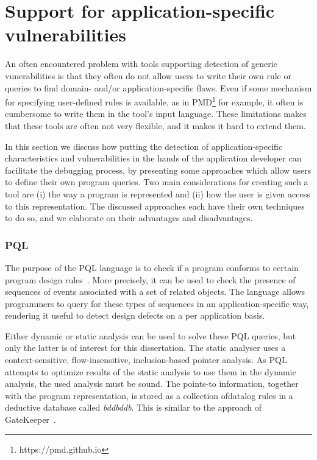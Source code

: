 \section{Support for application-specific vulnerabilities}
\label{sec:applicationSpecificVulnerabilities}

An often encountered problem with tools supporting detection of generic vunerabilities is that they often do not allow users to write their own rule or queries to find domain- and/or application-specific flaws. Even if some mechanism for specifying user-defined rules is available, as in PMD\footnote{https://pmd.github.io} for example, it often is cumbersome to write them in the tool's input language. These limitations makes that these tools are often not very flexible, and it makes it hard to extend them. 

In this section we discuss how putting the detection of application-specific characteristics and vulnerabilities in the hands of the application developer can facilitate the debugging process, by presenting some approaches which allow users to define their own program queries. Two main considerations for creating such a tool are (i) the way a program is represented and (ii) how the user is given access to this representation. The discussed approaches each have their own techniques to do so, and we elaborate on their advantages and disadvantages.


\subsubsection*{PQL}

The purpose of the PQL language is to check if a program conforms to certain program design rules~\cite{PQL}. More precisely, it can be used to check the presence of sequences of events associated with a set of related objects. The language allows programmers to query for these types of sequences in an application-specific way, rendering it useful to detect design defects on a per application basis.

Either dynamic or static analysis can be used to solve these PQL queries, but only the latter is of interest for this dissertation. The static analyser uses a context-sensitive, flow-insensitive, inclusion-based pointer analysis. As PQL attempts to optimize results of the static analysis to use them in the dynamic analysis, the used analysis must be sound. The points-to information, together with the program representation, is stored as a collection ofdatalog rules in a deductive database called \textit{bddbddb}. This is similar to the approach of GateKeeper~\cite{GateKeeper}.

